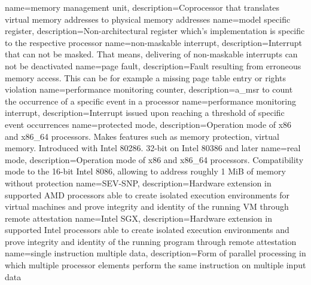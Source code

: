{
    name=memory management unit,
    description={Coprocessor that translates virtual memory addresses to physical memory addresses}
}
{
    name=model specific register,
    description={Non-architectural register which's implementation is specific to the respective processor}
}
%
{
    name=non-maskable interrupt,
    description={Interrupt that can not be masked. That means, delivering of non-maskable interrupts can not be
            deactivated}
}
%
{
    name=page fault,
    description={Fault resulting from erroneous memory access. This can be for example a missing page table entry or
            rights violation }
}
{
    name=performance monitoring counter,
    description={\acrshort{a_msr} to count the occurrence of a specific event in a processor}
}
{
    name=performance monitoring interrupt,
    description={Interrupt issued upon reaching a threshold of specific event occurrences}
}
{
    name=protected mode,
    description={Operation mode of x86 and x86\_64 processors. Makes features such as memory protection, virtual memory.
            Introduced with Intel 80286. 32-bit on Intel 80386 and later}
}
%
{
    name=real mode,
    description={Operation mode of x86 and x86\_64 processors. Compatibility mode to the 16-bit Intel 8086, allowing to
            address roughly 1 MiB of memory without protection}
}
%
{
    name=SEV-SNP,
    description={Hardware extension in supported AMD processors able to create isolated execution environments for
            virtual machines and prove integrity and identity of the running VM through remote attestation}
}
{
    name=Intel SGX,
    description={Hardware extension in supported Intel processors able to create isolated execution environments and
            prove integrity and identity of the running program through remote attestation}
}
{
    name={single instruction multiple data},
    description={Form of parallel processing in which multiple processor elements perform the same instruction on
            multiple input data}
}
